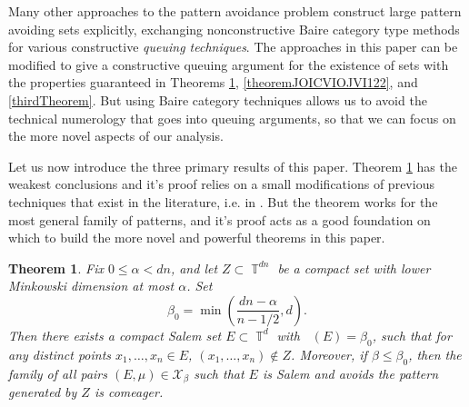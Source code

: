 \documentclass[dvipsnames,letterpaper,12pt]{article}
\numberwithin{equation}{section}
\DeclareMathOperator{\fordim}{\dim_{\mathbb{F}}}
\DeclareMathOperator{\TT}{\mathbb{T}}
\newtheorem{theorem}{Theorem}
\numberwithin{theorem}{section}
\begin{document}
Many other approaches \cite{OurPaper,PramanikFraser,Keleti} to the pattern avoidance problem construct large pattern avoiding sets explicitly, exchanging nonconstructive Baire category type methods for various constructive \emph{queuing techniques}. The approaches in this paper can be modified to give a constructive queuing argument for the existence of sets with the properties guaranteed in Theorems \ref{maintheorem}, \ref{theoremJOICVIOJVI122}, and \ref{thirdTheorem}. But using Baire category techniques allows us to avoid the technical numerology that goes into queuing arguments, so that we can focus on the more novel aspects of our analysis.



Let us now introduce the three primary results of this paper. Theorem \ref{maintheorem} has the weakest conclusions and it's proof relies on a small modifications of previous techniques that exist in the literature, i.e. in \cite{Korner1}. But the theorem works for the most general family of patterns, and it's proof acts as a good foundation on which to build the more novel and powerful theorems in this paper.

\begin{theorem} \label{maintheorem}
    Fix $0 \leq \alpha < dn$, and let $Z \subset \TT^{dn}$ be a compact set with lower Minkowski dimension at most $\alpha$. Set
    \[ \beta_0 = \min \left( \frac{dn - \alpha}{n-1/2}, d \right). \]
    Then there exists a compact Salem set $E \subset \TT^d$ with $\fordim(E) = \beta_0$, such that for any distinct points $x_1, \dots, x_n \in E$, $(x_1, \dots, x_n) \not \in Z$. Moreover, if $\beta \leq \beta_0$, then the family of all pairs $(E,\mu) \in \mathcal{X}_\beta$ such that $E$ is Salem and avoids the pattern generated by $Z$ is comeager.
\end{theorem}
\end{document}
